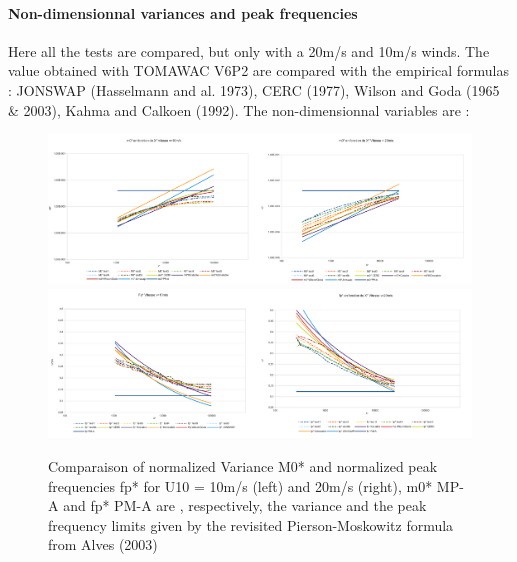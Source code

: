 \paragraph{Non-dimensionnal variances and peak frequencies}
Here all the tests are compared, but only with a 20m/s and 10m/s winds. The value obtained with TOMAWAC V6P2 are compared with the empirical formulas : JONSWAP (Hasselmann and al. 1973), CERC (1977), Wilson and Goda (1965 \& 2003), Kahma and Calkoen (1992). The non-dimensionnal variables are :\\
\begin{figure}[H]
  \centering
  	\includegraphics[width=0.5\textwidth]{M0v10id.pdf}\includegraphics[width=0.5\textwidth]{M0v20id.pdf}\\
  	\includegraphics[width=0.5\textwidth]{fpv10id.pdf}\includegraphics[width=0.5\textwidth]{fpv20id.pdf}\\
      \caption{Comparaison of normalized Variance M0* and normalized peak frequencies fp* for U10 = 10m/s (left) and 20m/s (right), m0* MP-A and fp* PM-A are , respectively, the variance and the peak frequency limits given by the revisited Pierson-Moskowitz formula from Alves (2003)}
\end{figure}
